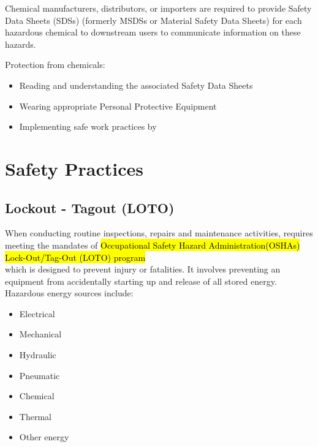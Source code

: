 \begin{itemize}
Chemical manufacturers, distributors, or importers are required to provide Safety Data Sheets (SDSs) (formerly MSDSs or Material Safety Data Sheets) for each hazardous chemical to downstream users to communicate information on these hazards.

Protection from chemicals:
\begin{itemize}
\item Reading and understanding the associated Safety Data Sheets
\item Wearing appropriate Personal Protective Equipment
\item Implementing safe work practices by

%
\end{itemize}




\section{Safety Practices}


\subsection{Lockout - Tagout (LOTO)}

When conducting routine inspections, repairs and maintenance activities, requires meeting the mandates of \hl{Occupational Safety  Hazard Administration(OSHAs) Lock-Out/Tag-Out (LOTO) program}\\
which is designed to prevent injury or fatalities.  It involves preventing an equipment from accidentally starting up and release of all stored energy.  Hazardous energy sources include: 
\begin{itemize}
\item Electrical 
\item Mechanical
\item Hydraulic
\item Pneumatic 
\item Chemical 
\item Thermal  
\item Other energy
\end{itemize}


\end{itemize}
